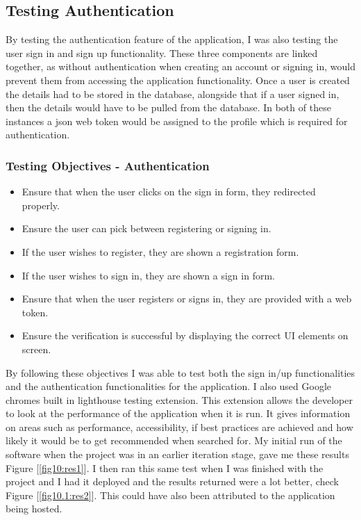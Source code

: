 \subsection{Testing Authentication}
By testing the authentication feature of the application, I was also testing the user sign in and sign up functionality. These three components are linked together, as without authentication when creating an account or signing in, would prevent them from accessing the application functionality. Once a user is created the details had to be stored in the database, alongside that if a user signed in, then the details would have to be pulled from the database. In both of these instances a json web token would be assigned to the profile which is required for authentication.

\subsubsection{Testing Objectives - Authentication}
\begin{itemize}
    \item Ensure that when the user clicks on the sign in form, they redirected properly.
    \item Ensure the user can pick between registering or signing in.
    \item If the user wishes to register, they are shown a registration form.
    \item If the user wishes to sign in, they are shown a sign in form.
    \item Ensure that when the user registers or signs in, they are provided with a web token.
    \item Ensure the verification is successful by displaying the correct UI elements on screen.
\end{itemize}
By following these objectives I was able to test both the sign in/up functionalities and the authentication functionalities for the application. I also used Google chromes built in lighthouse testing extension\cite{lighthouse}. This extension allows the developer to look at the performance of the application when it is run. It gives information on areas such as performance, accessibility, if best practices are achieved and how likely it would be to get recommended when searched for. My initial run of the software when the project was in an earlier iteration stage, gave me these results Figure [\ref{fig10:res1}]. I then ran this same test when I was finished with the project and I had it deployed and the results returned were a lot better, check Figure [\ref{fig10.1:res2}]. This could have also been attributed to the application being hosted.


